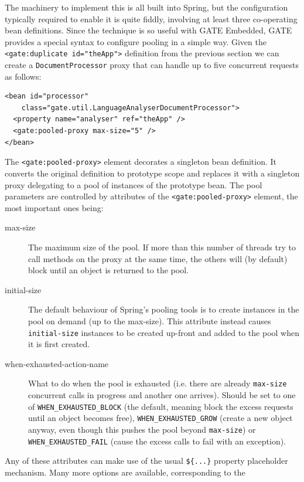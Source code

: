 The machinery to implement this is all built into Spring, but the configuration
typically required to enable it is quite fiddly, involving at least three
co-operating bean definitions.  Since the technique is so useful with GATE
Embedded, GATE provides a special syntax to configure pooling in a simple way.
Given the \verb|<gate:duplicate id="theApp">| definition from the previous
section we can create a \verb|DocumentProcessor| proxy that can handle up to
five concurrent requests as follows:
\begin{small}\begin{verbatim}
<bean id="processor"
    class="gate.util.LanguageAnalyserDocumentProcessor">
  <property name="analyser" ref="theApp" />
  <gate:pooled-proxy max-size="5" />
</bean>
\end{verbatim}\end{small}
%
The \verb|<gate:pooled-proxy>| element decorates a singleton bean definition.
It converts the original definition to prototype scope and replaces it with a
singleton proxy delegating to a pool of instances of the prototype bean.  The
pool parameters are controlled by attributes of the \verb|<gate:pooled-proxy>|
element, the most important ones being:
\begin{description}
\item[max-size] The maximum size of the pool.  If more than this number of
  threads try to call methods on the proxy at the same time, the others will
  (by default) block until an object is returned to the pool.
\item[initial-size] The default behaviour of Spring's pooling tools is to
  create instances in the pool on demand (up to the max-size).  This attribute
  instead causes \texttt{initial-size} instances to be created up-front and
  added to the pool when it is first created.
\item[when-exhausted-action-name] What to do when the pool is exhausted (i.e.
  there are already \texttt{max-size} concurrent calls in progress and another
  one arrives).  Should be set to one of \verb|WHEN_EXHAUSTED_BLOCK| (the
  default, meaning block the excess requests until an object becomes free),
  \verb|WHEN_EXHAUSTED_GROW| (create a new object anyway, even though this
  pushes the pool beyond \texttt{max-size}) or \verb|WHEN_EXHAUSTED_FAIL|
  (cause the excess calls to fail with an exception).
\end{description}
%
Any of these attributes can make use of the usual \verb!${...}! property
placeholder mechanism.  Many more options are available, corresponding to the
